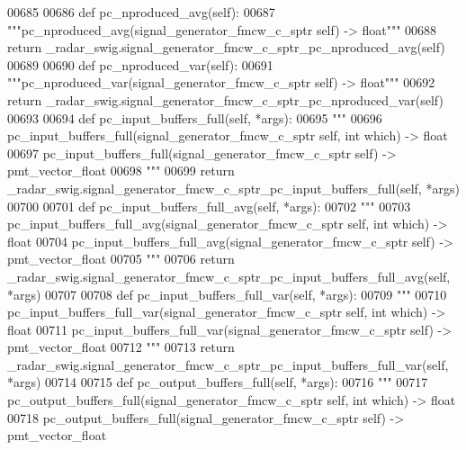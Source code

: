 \begin{DoxyCode}
{{{{00685 
00686     \textcolor{keyword}{def }pc_nproduced_avg(self):
00687         \textcolor{stringliteral}{"""pc\_nproduced\_avg(signal\_generator\_fmcw\_c\_sptr self) -> float"""}
00688         \textcolor{keywordflow}{return} \_radar\_swig.signal\_generator\_fmcw\_c\_sptr\_pc\_nproduced\_avg(self)
00689 
00690     \textcolor{keyword}{def }pc_nproduced_var(self):
00691         \textcolor{stringliteral}{"""pc\_nproduced\_var(signal\_generator\_fmcw\_c\_sptr self) -> float"""}
00692         \textcolor{keywordflow}{return} \_radar\_swig.signal\_generator\_fmcw\_c\_sptr\_pc\_nproduced\_var(self)
00693 
00694     \textcolor{keyword}{def }pc_input_buffers_full(self, *args):
00695         \textcolor{stringliteral}{"""}
00696 \textcolor{stringliteral}{        pc\_input\_buffers\_full(signal\_generator\_fmcw\_c\_sptr self, int which) -> float}
00697 \textcolor{stringliteral}{        pc\_input\_buffers\_full(signal\_generator\_fmcw\_c\_sptr self) -> pmt\_vector\_float}
00698 \textcolor{stringliteral}{        """}
00699         \textcolor{keywordflow}{return} \_radar\_swig.signal\_generator\_fmcw\_c\_sptr\_pc\_input\_buffers\_full(self, *args)
00700 
00701     \textcolor{keyword}{def }pc_input_buffers_full_avg(self, *args):
00702         \textcolor{stringliteral}{"""}
00703 \textcolor{stringliteral}{        pc\_input\_buffers\_full\_avg(signal\_generator\_fmcw\_c\_sptr self, int which) -> float}
00704 \textcolor{stringliteral}{        pc\_input\_buffers\_full\_avg(signal\_generator\_fmcw\_c\_sptr self) -> pmt\_vector\_float}
00705 \textcolor{stringliteral}{        """}
00706         \textcolor{keywordflow}{return} \_radar\_swig.signal\_generator\_fmcw\_c\_sptr\_pc\_input\_buffers\_full\_avg(self, *args)
00707 
00708     \textcolor{keyword}{def }pc_input_buffers_full_var(self, *args):
00709         \textcolor{stringliteral}{"""}
00710 \textcolor{stringliteral}{        pc\_input\_buffers\_full\_var(signal\_generator\_fmcw\_c\_sptr self, int which) -> float}
00711 \textcolor{stringliteral}{        pc\_input\_buffers\_full\_var(signal\_generator\_fmcw\_c\_sptr self) -> pmt\_vector\_float}
00712 \textcolor{stringliteral}{        """}
00713         \textcolor{keywordflow}{return} \_radar\_swig.signal\_generator\_fmcw\_c\_sptr\_pc\_input\_buffers\_full\_var(self, *args)
00714 
00715     \textcolor{keyword}{def }pc_output_buffers_full(self, *args):
00716         \textcolor{stringliteral}{"""}
00717 \textcolor{stringliteral}{        pc\_output\_buffers\_full(signal\_generator\_fmcw\_c\_sptr self, int which) -> float}
00718 \textcolor{stringliteral}{        pc\_output\_buffers\_full(signal\_generator\_fmcw\_c\_sptr self) -> pmt\_vector\_float}
}}}}
\end{DoxyCode}
